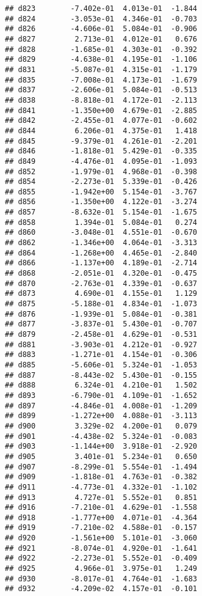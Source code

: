 \documentclass[
]{article}
\begin{document}
\begin{verbatim}
## d823        -7.402e-01  4.013e-01  -1.844
## d824        -3.053e-01  4.346e-01  -0.703
## d826        -4.606e-01  5.084e-01  -0.906
## d827         2.713e-01  4.012e-01   0.676
## d828        -1.685e-01  4.303e-01  -0.392
## d829        -4.638e-01  4.195e-01  -1.106
## d831        -5.087e-01  4.315e-01  -1.179
## d835        -7.008e-01  4.173e-01  -1.679
## d837        -2.606e-01  5.084e-01  -0.513
## d838        -8.818e-01  4.172e-01  -2.113
## d841        -1.350e+00  4.679e-01  -2.885
## d842        -2.455e-01  4.077e-01  -0.602
## d844         6.206e-01  4.375e-01   1.418
## d845        -9.379e-01  4.261e-01  -2.201
## d846        -1.818e-01  5.429e-01  -0.335
## d849        -4.476e-01  4.095e-01  -1.093
## d852        -1.979e-01  4.968e-01  -0.398
## d854        -2.273e-01  5.339e-01  -0.426
## d855        -1.942e+00  5.154e-01  -3.767
## d856        -1.350e+00  4.122e-01  -3.274
## d857        -8.632e-01  5.154e-01  -1.675
## d858         1.394e-01  5.084e-01   0.274
## d860        -3.048e-01  4.551e-01  -0.670
## d862        -1.346e+00  4.064e-01  -3.313
## d864        -1.268e+00  4.465e-01  -2.840
## d866        -1.137e+00  4.189e-01  -2.714
## d868        -2.051e-01  4.320e-01  -0.475
## d870        -2.763e-01  4.339e-01  -0.637
## d873         4.690e-01  4.155e-01   1.129
## d875        -5.188e-01  4.834e-01  -1.073
## d876        -1.939e-01  5.084e-01  -0.381
## d877        -3.837e-01  5.430e-01  -0.707
## d879        -2.458e-01  4.629e-01  -0.531
## d881        -3.903e-01  4.212e-01  -0.927
## d883        -1.271e-01  4.154e-01  -0.306
## d885        -5.606e-01  5.324e-01  -1.053
## d887        -8.443e-02  5.430e-01  -0.155
## d888         6.324e-01  4.210e-01   1.502
## d893        -6.790e-01  4.109e-01  -1.652
## d897        -4.846e-01  4.008e-01  -1.209
## d899        -1.272e+00  4.088e-01  -3.113
## d900         3.329e-02  4.200e-01   0.079
## d901        -4.438e-02  5.324e-01  -0.083
## d903        -1.144e+00  3.918e-01  -2.920
## d905         3.401e-01  5.234e-01   0.650
## d907        -8.299e-01  5.554e-01  -1.494
## d909        -1.818e-01  4.763e-01  -0.382
## d911        -4.773e-01  4.332e-01  -1.102
## d913         4.727e-01  5.552e-01   0.851
## d916        -7.210e-01  4.629e-01  -1.558
## d918        -1.777e+00  4.071e-01  -4.364
## d919        -7.210e-02  4.588e-01  -0.157
## d920        -1.561e+00  5.101e-01  -3.060
## d921        -8.074e-01  4.920e-01  -1.641
## d922        -2.273e-01  5.552e-01  -0.409
## d925         4.966e-01  3.975e-01   1.249
## d930        -8.017e-01  4.764e-01  -1.683
## d932        -4.209e-02  4.157e-01  -0.101

\end{verbatim}
\end{document}
